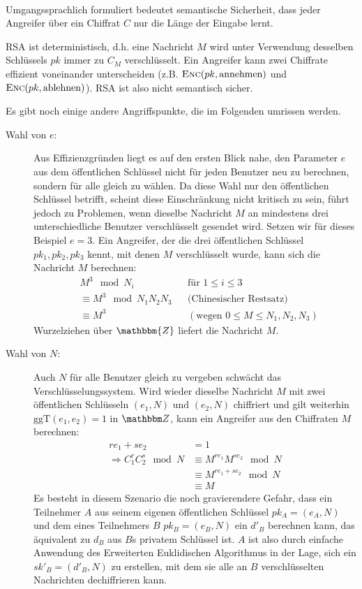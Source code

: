 ~\\
Umgangssprachlich formuliert bedeutet semantische Sicherheit, dass jeder Angreifer über ein Chiffrat $C$ nur die Länge der Eingabe lernt.

RSA ist deterministisch, d.h. eine Nachricht $M$ wird unter Verwendung desselben Schlüssels $pk$ immer zu $C_M$ verschlüsselt. Ein Angreifer kann zwei Chiffrate
effizient voneinander unterscheiden (z.B. $\textsc{Enc}(pk, \text{annehmen})$ und $\textsc{Enc}(pk, \text{ablehnen})$). RSA ist also nicht semantisch sicher.

Es gibt noch einige andere Angriffspunkte, die im Folgenden umrissen werden.

\begin{description}
    \item[Wahl von $e$:] Aus Effizienzgründen liegt es auf den ersten Blick nahe, den Parameter $e$ aus dem öffentlichen Schlüssel nicht für jeden Benutzer neu
    zu berechnen, sondern für alle gleich zu wählen. Da diese Wahl nur den öffentlichen Schlüssel betrifft, scheint diese Einschränkung nicht kritisch zu sein,
    führt jedoch zu Problemen, wenn dieselbe Nachricht $M$ an mindestens drei unterschiedliche Benutzer verschlüsselt gesendet wird. Setzen wir für dieses Beispiel $e =
    3$. Ein Angreifer, der die drei öffentlichen Schlüssel $pk_1, pk_2, pk_3$ kennt, mit denen $M$ verschlüsselt wurde, kann sich die Nachricht $M$ berechnen:
    \begin{align*}
    & M^3 \mod N_i  && \text{für } 1 \leq i \leq 3\\
    & \equiv M^3 \mod N_1N_2N_3  && \text{(Chinesischer Restsatz)}\\
    & \equiv M^3 && (\text{wegen } 0 \leq M \leq N_1,N_2,N_3)
    \end{align*}
    Wurzelziehen über $\mathbbm{Z}$ liefert die Nachricht $M$.
    
    \item[Wahl von $N$:] Auch $N$ für alle Benutzer gleich zu vergeben schwächt das Verschlüsselungssystem. Wird wieder dieselbe Nachricht $M$ mit zwei
    öffentlichen Schlüsseln $(e_1, N)$ und $(e_2, N)$ chiffriert und gilt weiterhin $\text{ggT}(e_1, e_2) = 1$ in $\Z{}$, kann ein Angreifer aus den Chiffraten
    $M$ berechnen:
    \begin{align*}
    re_1 + se_2 & = 1\\ 
    \Longrightarrow C_1^rC_2^s \mod N & \equiv M^{re_1}M^{se_2} \mod N\\
    & \equiv M^{re_1 + se_2} \mod N\\
    & \equiv M
    \end{align*}
    Es besteht in diesem Szenario die noch gravierendere Gefahr, dass ein Teilnehmer $A$ aus seinem eigenen öffentlichen Schlüssel $pk_A = (e_A, N)$ und
    dem eines Teilnehmers $B$ $pk_B = (e_B, N)$ ein $d'_B$ berechnen kann, das äquivalent zu $d_B$ aus $B$s privatem Schlüssel ist. $A$ ist also durch einfache
    Anwendung des Erweiterten Euklidischen Algorithmus in der Lage, sich ein $sk'_B = (d'_B, N)$ zu erstellen, mit dem sie alle an $B$ verschlüsselten    
    Nachrichten dechiffrieren kann.
    

\end{description}
